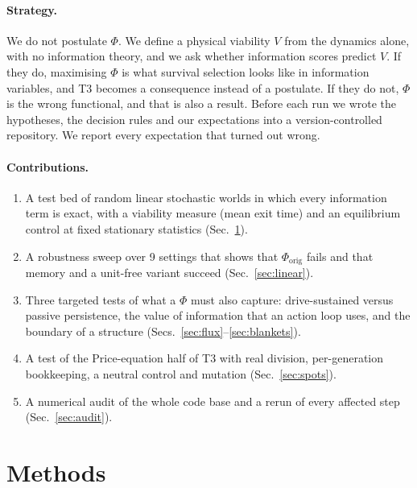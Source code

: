 \documentclass[11pt]{article}
\newcommand{\Phiorig}{\Phi_{\mathrm{orig}}}
\begin{document}
\paragraph{Strategy.} We do not postulate $\Phi$. We define a physical viability $V$ from the dynamics alone, with no
information theory, and we ask whether information scores predict $V$. If they do, maximising $\Phi$ is what survival
selection looks like in information variables, and T3 becomes a consequence instead of a postulate. If they do not,
$\Phi$ is the wrong functional, and that is also a result. Before each run we wrote the hypotheses, the decision
rules and our expectations into a version-controlled repository. We report every expectation that turned out wrong.

\paragraph{Contributions.}
\begin{enumerate}
  \item A test bed of random linear stochastic worlds in which every information term is exact, with a viability
  measure (mean exit time) and an equilibrium control at fixed stationary statistics (Sec.~\ref{sec:methods}).
  \item A robustness sweep over 9 settings that shows that $\Phiorig$ fails and that memory and a unit-free variant
  succeed (Sec.~\ref{sec:linear}).
  \item Three targeted tests of what a $\Phi$ must also capture: drive-sustained versus passive persistence, the value of
  information that an action loop uses, and the boundary of a structure (Secs.~\ref{sec:flux}--\ref{sec:blankets}).
  \item A test of the Price-equation half of T3 with real division, per-generation bookkeeping, a neutral control and
  mutation (Sec.~\ref{sec:spots}).
  \item A numerical audit of the whole code base and a rerun of every affected step (Sec.~\ref{sec:audit}).
\end{enumerate}

\section{Methods}
\label{sec:methods}
\end{document}
